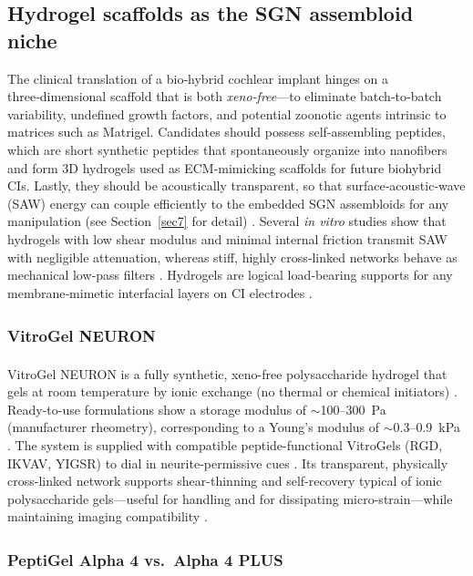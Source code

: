 \documentclass[referee,pdflatex, sn-vancouver-num]{sn-jnl}%
\theoremstyle{thmstyleone}%
\theoremstyle{thmstyletwo}%
\theoremstyle{thmstylethree}%
\begin{document}
\subsection{Hydrogel scaffolds as the SGN assembloid niche}
The clinical translation of a bio‑hybrid cochlear implant hinges on a three‑dimensional scaffold that is both \emph{xeno‑free}—to eliminate batch‑to‑batch variability, undefined growth factors, and potential zoonotic agents intrinsic to matrices such as Matrigel. Candidates should possess self-assembling peptides, which are short synthetic peptides that spontaneously organize into nanofibers and form 3D hydrogels used as ECM-mimicking scaffolds for future biohybrid CIs. Lastly, they should be acoustically transparent, so that surface‑acoustic‑wave (SAW) energy can couple efficiently to the embedded SGN assembloids for any manipulation (see Section~\ref{sec7} for detail) \cite{Aisenbrey2020,Kozlowski2021,Sebastian2023}. 
Several \textit{in vitro} studies show that hydrogels with low shear modulus and minimal internal friction transmit SAW with negligible attenuation, whereas stiff, highly cross‑linked networks behave as mechanical low‑pass filters \cite{Sebastian2023,Liao2008,Haruna2020}. Hydrogels are logical load‑bearing supports for any membrane‑mimetic interfacial layers on CI electrodes \cite{Carnicer-Lombarte:2025aa}.

\subsubsection{VitroGel\texorpdfstring{\textsuperscript{\textregistered}}{ (R)} NEURON} 
VitroGel\textsuperscript{\textregistered} NEURON is a fully synthetic, xeno-free polysaccharide hydrogel that gels at room temperature by ionic exchange (no thermal or chemical initiators) \cite{TheWell_GelationWorks,TheWell_NeuronPage}. Ready-to-use formulations show a storage modulus of \(\sim\)100–300~Pa (manufacturer rheometry), corresponding to a Young’s modulus of \(\sim\)0.3–0.9~kPa \citep{TheWell_ReadyToUseModulus}. The system is supplied with compatible peptide-functional VitroGels (RGD, IKVAV, YIGSR) to dial in neurite-permissive cues \citep{TheWell_RGD,TheWell_IKVAV,TheWell_YIGSR}. Its transparent, physically cross-linked network supports shear-thinning and self-recovery typical of ionic polysaccharide gels—useful for handling and for dissipating micro-strain—while maintaining imaging compatibility \citep{TheWell_NeuronPage,Karvinen2022SelfHealing,Nishimura2023SelfHealing}.

\subsubsection{PeptiGel\texorpdfstring{\textsuperscript{\textregistered}}{ (R)} Alpha 4 vs.\ Alpha 4 PLUS}
\end{document}
